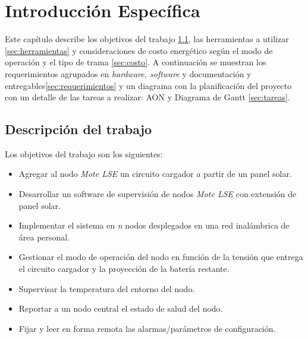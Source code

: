 \chapter{Introducción Específica} %

\label{Chapter2}

Este capítulo describe los objetivos del trabajo \ref{sec:trabajo}, las herramientas a utilizar \ref{sec:herramientas} y consideraciones de costo energético según el modo de operación y el tipo de trama \ref{sec:costo}. A continuación se muestran los requerimientos agrupados en \textit{hardware, software} y documentación y entregables\ref{sec:requerimientos} y un diagrama con la planificación del proyecto con un detalle de las tareas a realizar: AON y Diagrama de Gantt \ref{sec:tareas}.

\section{Descripción del trabajo}
\label{sec:trabajo}
\noindent Los objetivos del trabajo son los siguientes:

\begin{itemize}
	\item Agregar al nodo \textit{Mote LSE} un circuito cargador a partir de un panel solar.
	\item Desarrollar un software de supervisión de nodos \textit{Mote LSE} con extensión de panel solar.
	\item Implementar el sistema en \textit{n} nodos desplegados en una red inalámbrica de área personal.
	\item Gestionar el modo de operación del nodo en función de la tensión que entrega el circuito cargador y la proyección de la batería restante.
	\item Supervisar la temperatura del entorno del nodo.
	\item Reportar a un nodo central el estado de salud del nodo.
	\item Fijar y leer en forma remota las alarmas/parámetros de configuración.
	\end{itemize}

